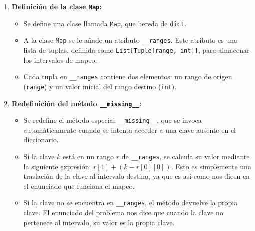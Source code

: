 \documentclass[a4paper,12pt]{article}
\begin{document}
\begin{enumerate}
    \item \textbf{Definición de la clase \texttt{Map}:}
    \begin{itemize}
        \item Se define una clase llamada \lstinline{Map}, que hereda de \lstinline{dict}.
        \item A la clase \lstinline{Map} se le añade un atributo \lstinline{__ranges}. Este atributo es una lista de tuplas, definida como \lstinline{List[Tuple[range, int]]}, para almacenar los intervalos de mapeo.
        \item Cada tupla en \lstinline{__ranges} contiene dos elementos: un rango de origen (\lstinline{range}) y un valor inicial del rango destino (\lstinline{int}).
    \end{itemize}

    \item \textbf{Redefinición del método \texttt{\_\_missing\_\_}:}
    \begin{itemize}
        \item Se redefine el método especial \lstinline{__missing__}, que se invoca automáticamente cuando se intenta acceder a una clave ausente en el diccionario.
        
        \item Si la clave $k$ está en un rango $r$ de \lstinline{__ranges}, se calcula su valor mediante la siguiente expresión: $r[1] + (k - r[0][0])$.  Esto es simplemente una traslación de la clave al intervalo destino, ya que es así como nos dicen en el enunciado que funciona el mapeo.

        \item Si la clave no se encuentra en \lstinline{__ranges}, el método devuelve la propia clave. El enunciado del problema nos dice que cuando la clave no pertenece al intervalo, su valor es la propia clave.
    \end{itemize}


\end{enumerate}
\end{document}
